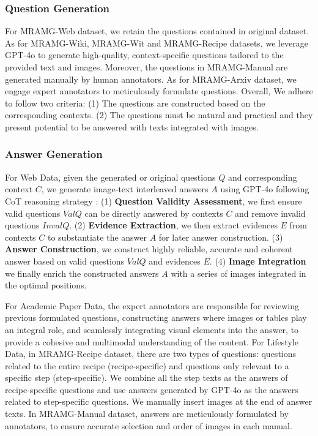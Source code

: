 \subsubsection{Question Generation}
For MRAMG-Web dataset, we retain the questions contained in original dataset. As for MRAMG-Wiki, MRAMG-Wit and MRAMG-Recipe datasets, we leverage GPT-4o to generate high-quality, context-specific questions tailored to the provided text and images. Moreover, the questions in MRAMG-Manual are generated manually by human annotators. As for MRAMG-Arxiv dataset, we engage expert annotators to meticulously formulate questions. Overall, We adhere to follow two criteria: (1) The questions are constructed based on the corresponding contexts. (2) The questions must be natural and practical and they present potential to be answered with texts integrated with images.

\subsubsection{Answer Generation} 
For Web Data, given the generated or original questions $Q$ and corresponding context $C$, we generate image-text interleaved answers $A$ using GPT-4o following CoT reasoning strategy \citep{COT}: (1) \textbf{Question Validity Assessment}, we first ensure valid questions $ValQ$ can be directly answered by contexts $C$ and remove invalid questions $InvalQ$. (2) \textbf{Evidence Extraction}, we then extract evidences $E$ from contexts $C$ to substantiate the answer $A$ for later answer construction. (3) \textbf{Answer Construction}, we construct highly reliable, accurate and coherent answer based on valid questions $ValQ$ and evidences $E$. (4) \textbf{Image Integration} we finally enrich the constructed answers $A$ with a series of images integrated in the optimal positions. 

For Academic Paper Data, the expert annotators are responsible for reviewing previous formulated questions, constructing answers where images or tables play an integral role, and seamlessly integrating visual elements into the answer, to provide a cohesive and multimodal understanding of the content. For Lifestyle Data, in MRAMG-Recipe dataset, there are two types of questions: questions related to the entire recipe (recipe-specific) and questions only relevant to a specific step (step-specific). We combine all the step texts as the answers of recipe-specific questions and use answers generated by GPT-4o as the answers related to step-specific questions. We manually insert images at the end of answer texts. In MRAMG-Manual dataset, answers are meticulously formulated by annotators, to ensure accurate selection and order of images in each manual.


